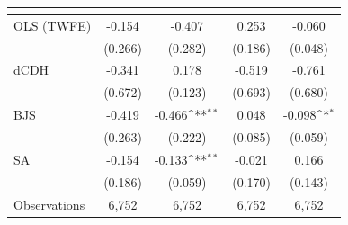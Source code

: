 {
\def\sym#1{\ifmmode^{#1}\else\(^{#1}\)\fi}
\begin{tabular}{l*{4}{c}}
\toprule
            &&&&\\
\midrule
OLS (TWFE) & -0.154 & -0.407 & 0.253 & -0.060 \\
             & (0.266) & (0.282) & (0.186) & (0.048) \\
dCDH & -0.341 & 0.178 & -0.519 & -0.761 \\
             & (0.672) & (0.123) & (0.693) & (0.680) \\
BJS & -0.419 & -0.466\sym{**} & 0.048 & -0.098\sym{*} \\
             & (0.263) & (0.222) & (0.085) & (0.059) \\
SA & -0.154 & -0.133\sym{**} & -0.021 & 0.166 \\
             & (0.186) & (0.059) & (0.170) & (0.143) \\
\midrule
Observations & 6,752 & 6,752 & 6,752 & 6,752 \\
\bottomrule
\end{tabular}
}
